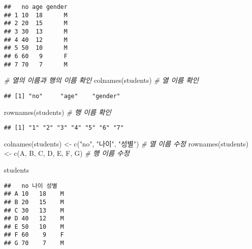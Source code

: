 \documentclass[
]{article}
\newenvironment{Shaded}{\begin{snugshade}}{\end{snugshade}}
\newcommand{\CommentTok}[1]{\textcolor[rgb]{0.56,0.35,0.01}{\textit{#1}}}
\newcommand{\FunctionTok}[1]{\textcolor[rgb]{0.00,0.00,0.00}{#1}}
\newcommand{\NormalTok}[1]{#1}
\newcommand{\OtherTok}[1]{\textcolor[rgb]{0.56,0.35,0.01}{#1}}
\newcommand{\StringTok}[1]{\textcolor[rgb]{0.31,0.60,0.02}{#1}}
\begin{document}
\begin{verbatim}
##   no age gender
## 1 10  18      M
## 2 20  15      M
## 3 30  13      M
## 4 40  12      M
## 5 50  10      M
## 6 60   9      F
## 7 70   7      M
\end{verbatim}

\begin{Shaded}
\begin{Highlighting}[]
\CommentTok{\# 열의 이름과 행의 이름 확인}
\FunctionTok{colnames}\NormalTok{(students)  }\CommentTok{\# 열 이름 확인}
\end{Highlighting}
\end{Shaded}

\begin{verbatim}
## [1] "no"     "age"    "gender"
\end{verbatim}

\begin{Shaded}
\begin{Highlighting}[]
\FunctionTok{rownames}\NormalTok{(students)  }\CommentTok{\# 행 이름 확인}
\end{Highlighting}
\end{Shaded}

\begin{verbatim}
## [1] "1" "2" "3" "4" "5" "6" "7"
\end{verbatim}

\begin{Shaded}
\begin{Highlighting}[]
\FunctionTok{colnames}\NormalTok{(students)  }\OtherTok{\textless{}{-}} \FunctionTok{c}\NormalTok{(}\StringTok{"no"}\NormalTok{, }\StringTok{"나이"}\NormalTok{, }\StringTok{"성별"}\NormalTok{)               }\CommentTok{\# 열 이름 수정}
\FunctionTok{rownames}\NormalTok{(students)  }\OtherTok{\textless{}{-}} \FunctionTok{c}\NormalTok{(}\StringTok{\textquotesingle{}A\textquotesingle{}}\NormalTok{, }\StringTok{\textquotesingle{}B\textquotesingle{}}\NormalTok{, }\StringTok{\textquotesingle{}C\textquotesingle{}}\NormalTok{, }\StringTok{\textquotesingle{}D\textquotesingle{}}\NormalTok{, }\StringTok{\textquotesingle{}E\textquotesingle{}}\NormalTok{, }\StringTok{\textquotesingle{}F\textquotesingle{}}\NormalTok{, }\StringTok{\textquotesingle{}G\textquotesingle{}}\NormalTok{)  }\CommentTok{\# 행 이름 수정}

\NormalTok{students}
\end{Highlighting}
\end{Shaded}

\begin{verbatim}
##   no 나이 성별
## A 10   18    M
## B 20   15    M
## C 30   13    M
## D 40   12    M
## E 50   10    M
## F 60    9    F
## G 70    7    M
\end{verbatim}
\end{document}
